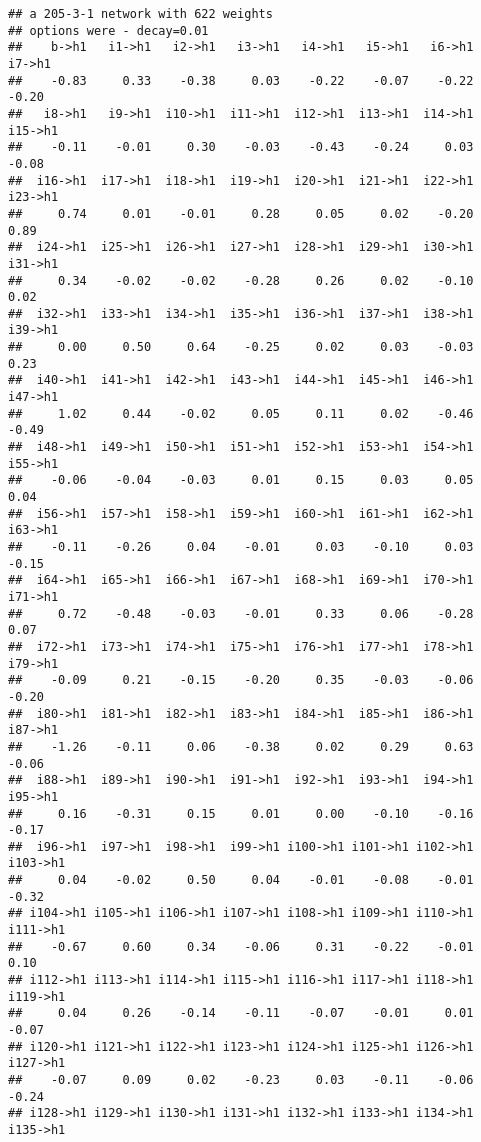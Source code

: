 \documentclass[
]{article}
\begin{document}
\begin{verbatim}
## a 205-3-1 network with 622 weights
## options were - decay=0.01
##    b->h1   i1->h1   i2->h1   i3->h1   i4->h1   i5->h1   i6->h1   i7->h1 
##    -0.83     0.33    -0.38     0.03    -0.22    -0.07    -0.22    -0.20 
##   i8->h1   i9->h1  i10->h1  i11->h1  i12->h1  i13->h1  i14->h1  i15->h1 
##    -0.11    -0.01     0.30    -0.03    -0.43    -0.24     0.03    -0.08 
##  i16->h1  i17->h1  i18->h1  i19->h1  i20->h1  i21->h1  i22->h1  i23->h1 
##     0.74     0.01    -0.01     0.28     0.05     0.02    -0.20     0.89 
##  i24->h1  i25->h1  i26->h1  i27->h1  i28->h1  i29->h1  i30->h1  i31->h1 
##     0.34    -0.02    -0.02    -0.28     0.26     0.02    -0.10     0.02 
##  i32->h1  i33->h1  i34->h1  i35->h1  i36->h1  i37->h1  i38->h1  i39->h1 
##     0.00     0.50     0.64    -0.25     0.02     0.03    -0.03     0.23 
##  i40->h1  i41->h1  i42->h1  i43->h1  i44->h1  i45->h1  i46->h1  i47->h1 
##     1.02     0.44    -0.02     0.05     0.11     0.02    -0.46    -0.49 
##  i48->h1  i49->h1  i50->h1  i51->h1  i52->h1  i53->h1  i54->h1  i55->h1 
##    -0.06    -0.04    -0.03     0.01     0.15     0.03     0.05     0.04 
##  i56->h1  i57->h1  i58->h1  i59->h1  i60->h1  i61->h1  i62->h1  i63->h1 
##    -0.11    -0.26     0.04    -0.01     0.03    -0.10     0.03    -0.15 
##  i64->h1  i65->h1  i66->h1  i67->h1  i68->h1  i69->h1  i70->h1  i71->h1 
##     0.72    -0.48    -0.03    -0.01     0.33     0.06    -0.28     0.07 
##  i72->h1  i73->h1  i74->h1  i75->h1  i76->h1  i77->h1  i78->h1  i79->h1 
##    -0.09     0.21    -0.15    -0.20     0.35    -0.03    -0.06    -0.20 
##  i80->h1  i81->h1  i82->h1  i83->h1  i84->h1  i85->h1  i86->h1  i87->h1 
##    -1.26    -0.11     0.06    -0.38     0.02     0.29     0.63    -0.06 
##  i88->h1  i89->h1  i90->h1  i91->h1  i92->h1  i93->h1  i94->h1  i95->h1 
##     0.16    -0.31     0.15     0.01     0.00    -0.10    -0.16    -0.17 
##  i96->h1  i97->h1  i98->h1  i99->h1 i100->h1 i101->h1 i102->h1 i103->h1 
##     0.04    -0.02     0.50     0.04    -0.01    -0.08    -0.01    -0.32 
## i104->h1 i105->h1 i106->h1 i107->h1 i108->h1 i109->h1 i110->h1 i111->h1 
##    -0.67     0.60     0.34    -0.06     0.31    -0.22    -0.01     0.10 
## i112->h1 i113->h1 i114->h1 i115->h1 i116->h1 i117->h1 i118->h1 i119->h1 
##     0.04     0.26    -0.14    -0.11    -0.07    -0.01     0.01    -0.07 
## i120->h1 i121->h1 i122->h1 i123->h1 i124->h1 i125->h1 i126->h1 i127->h1 
##    -0.07     0.09     0.02    -0.23     0.03    -0.11    -0.06    -0.24 
## i128->h1 i129->h1 i130->h1 i131->h1 i132->h1 i133->h1 i134->h1 i135->h1 

\end{verbatim}
\end{document}
